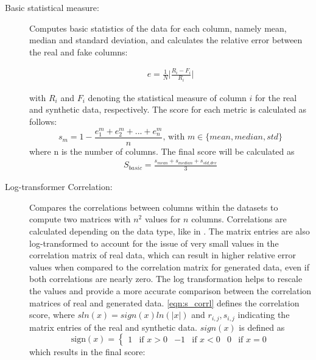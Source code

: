 \begin{description}
  \item[Basic statistical measure:]
  Computes basic statistics of the data for each column, namely mean, median and standard deviation, and calculates the relative error between the real and fake columns:
  
  \begin{equation}
    \begin{align*}
      \label{eqn:rel_err}
      e=\frac{1}{N} \bigg| \frac{R_i-F_i}{R_i} \bigg| 
      \end{align*}
  \end{equation}

  with $R_i$ and $F_i$ denoting the statistical measure of column $i$ for the real and synthetic data, respectively.
  The score for each metric is calculated as follows:
  $$s_m = 1-\frac{e^m_1+e^m_2+...+e^m_n}{n} \textrm{, with }m \in \{mean, median, std\}$$
  where n is the number of columns.
  The final score will be calculated as
  \begin{equation}
    \begin{align*}
      \label{eqn:s_basic}
      S_{basic} = \frac{s_{mean}+s_{median}+s_{std\_dev}}{3}
      \end{align*}
  \end{equation}


  \item[Log-transformer Correlation:]
  Compares the correlations between columns within the datasets to compute two matrices with $n^2$ values for $n$ columns.
  Correlations are calculated depending on the data type, like in \cite{brenninkmeijer2019GenerationEvaluationTabular}.
  The matrix entries are also log-transformed to account for the issue of very small values in the correlation matrix of real data, which can result in higher relative error values when compared to the correlation matrix for generated data, even if both correlations are nearly zero. 
  The log transformation helps to rescale the values and provide a more accurate comparison between the correlation matrices of real and generated data.
  \autoref{eqn:s_corrl} defines the correlation score, where $sln(x) = sign(x)ln(|x|)$ and $r_{i,j}, s_{i,j}$ indicating the matrix entries of the real and synthetic data.
  $sign(x)$ is defined as
  $$\textrm{sign}(x) = \begin{cases}1 & \text{if } x > 0 & -1 & \text{if } x < 0 & 0 & \text{if } x = 0\end{cases}$$
  which results in the final score:
  

\end{description}
